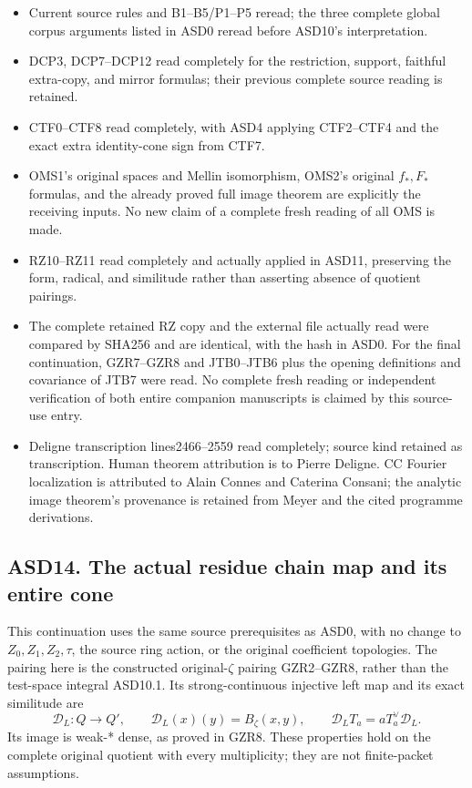 \begin{itemize}
\tightlist
\item
  Current source rules and B1--B5/P1--P5 reread; the three complete
  global corpus arguments listed in ASD0 reread before ASD10's
  interpretation.
\item
  DCP3, DCP7--DCP12 read completely for the restriction, support,
  faithful extra-copy, and mirror formulas; their previous complete
  source reading is retained.
\item
  CTF0--CTF8 read completely, with ASD4 applying CTF2--CTF4 and the
  exact extra identity-cone sign from CTF7.
\item
  OMS1's original spaces and Mellin isomorphism, OMS2's original
  \(f_*,F_*\) formulas, and the already proved full image theorem are
  explicitly the receiving inputs. No new claim of a complete fresh
  reading of all OMS is made.
\item
  RZ10--RZ11 read completely and actually applied in ASD11, preserving
  the form, radical, and similitude rather than asserting absence of
  quotient pairings.
\item
  The complete retained RZ copy and the external file actually read were
  compared by SHA256 and are identical, with the hash in ASD0. For the
  final continuation, GZR7--GZR8 and JTB0--JTB6 plus the opening
  definitions and covariance of JTB7 were read. No complete fresh
  reading or independent verification of both entire companion
  manuscripts is claimed by this source-use entry.
\item
  Deligne transcription lines2466--2559 read completely; source kind
  retained as transcription. Human theorem attribution is to Pierre
  Deligne. CC Fourier localization is attributed to Alain Connes and
  Caterina Consani; the analytic image theorem's provenance is retained
  from Meyer and the cited programme derivations.
\end{itemize}

\subsection{ASD14. The actual residue chain map and its entire
cone}\label{asd14.-the-actual-residue-chain-map-and-its-entire-cone}

This continuation uses the same source prerequisites as ASD0, with no
change to \(Z_0,Z_1,Z_2,\tau\), the source ring action, or the original
coefficient topologies. The pairing here is the constructed
original-\(\zeta\) pairing GZR2--GZR8, rather than the test-space
integral ASD10.1. Its strong-continuous injective left map and its exact
similitude are \[
 \mathcal D_L:Q\to Q',\qquad
 \mathcal D_L(x)(y)=B_\zeta(x,y),\qquad
 \mathcal D_LT_a=aT_a^\vee\mathcal D_L.
 \tag{ASD14.1}
\] Its image is weak-* dense, as proved in GZR8. These properties hold
on the complete original quotient with every multiplicity; they are not
finite-packet assumptions.

